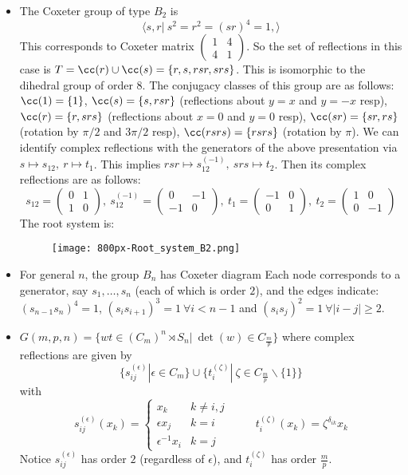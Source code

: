 \begin{definition}
\begin{itemize}
  \item The Coxeter group of type $B_2$ is 
  $$\langle s,r|\ s^2=r^2=(sr)^4=1, \rangle$$
    This corresponds to Coxeter matrix $\begin{pmatrix}1 & 4 \\ 4 & 1 \end{pmatrix}$. 
    So the set of reflections in this case is $T=\cc(r)\cup \cc(s)=\{r,s,rsr,srs\}$. This is isomorphic to the dihedral group of order $8$. The conjugacy classes of this group are as follows: $\cc(1)=\{1\}$, $\cc(s)=\{s,rsr\}$ (reflections about $y=x$ and $y=-x$ resp), $\cc(r)=\{r,srs\}$ (reflections about $x=0$ and $y=0$ resp), $\cc(sr)=\{sr,rs\}$ (rotation by $\pi/2$ and $3\pi/2$ resp), $\cc(rsrs)=\{rsrs\}$ (rotation by $\pi$).
    We can identify complex reflections with the generators of the above presentation via $s\mapsto s_{12},\ r\mapsto t_1$. This implies $rsr\mapsto s_{12}^{(-1)}, \ srs\mapsto t_2$. Then its complex reflections are as follows:
    $$s_{12}=\begin{pmatrix}0 & 1 \\1 & 0\end{pmatrix},\ 
    s_{12}^{(-1)}=\begin{pmatrix}0 & -1\\-1 & 0\end{pmatrix},\ 
    t_1=\begin{pmatrix}-1 & 0\\ 0 & 1\end{pmatrix},\ 
    t_2=\begin{pmatrix}1 & 0\\ 0 & -1\end{pmatrix}$$
    The root system is:\\
    \begin{figure}[h]
    \texttt{[image: 800px-Root\_system\_B2.png]}
    \centering
    \end{figure}
    
    \item For general $n$, the group $B_n$ has Coxeter diagram 
    Each node corresponds to a generator, say $s_1,\dots,s_n$ (each of which is order $2$), and the edges indicate: $(s_{n-1}s_n)^4=1$, $(s_i s_{i+1})^3=1\ \forall i<n-1$ and $(s_is_j)^2=1\ \forall |i-j|\geq 2$.
    
    \item $G(m,p,n)=\{wt\in (C_m)^n\rtimes S_n|\ \det(w)\in C_{\frac{m}{p}}\}$ where complex reflections are given by $$\{s_{ij}^{(\epsilon)}| \epsilon\in C_m\}\cup \{t_i^{(\zeta)}|\ \zeta\in C_{\frac{m}{p}}\backslash \{1\}\}$$ with $$s_{ij}^{(\epsilon)}(x_k)=\begin{cases}x_k & k\neq i,j\\ \epsilon x_j & k=i \\ \epsilon^{-1}x_i & k=j\end{cases}\hspace{1cm} t_i^{(\zeta)}(x_k)=\zeta^{\delta_{ik}}x_k$$
    Notice $s_{ij}^{(\epsilon)}$ has order $2$ (regardless of $\epsilon$), and $t_i^{(\zeta)}$ has order $\frac{m}{p}$.


\end{itemize}
\end{definition}
